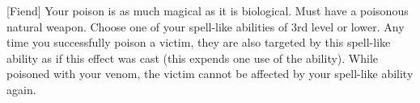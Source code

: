  {[Fiend]}
\shortdescfeat
{Your poison is as much magical as it is biological.}
{Must have a poisonous natural weapon.}
{Choose one of your spell-like abilities of 3rd level or lower. Any time you successfully poison a victim, they are also targeted by this spell-like ability as if this effect was cast (this expends one use of the ability). While poisoned with your venom, the victim cannot be affected by your spell-like ability again.}